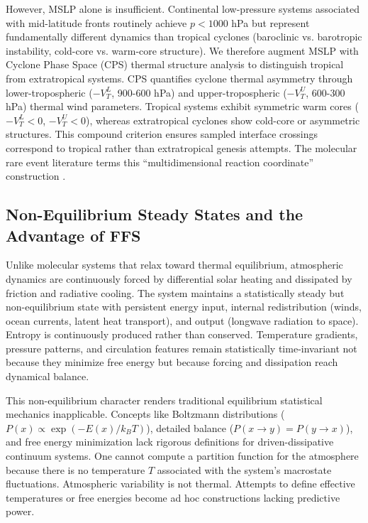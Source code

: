 \documentclass[11pt]{article}
\begin{document}
However, MSLP alone is insufficient. Continental low-pressure systems associated with mid-latitude fronts routinely achieve $p < 1000$ hPa but represent fundamentally different dynamics than tropical cyclones (baroclinic vs. barotropic instability, cold-core vs. warm-core structure). We therefore augment MSLP with Cyclone Phase Space (CPS) thermal structure analysis to distinguish tropical from extratropical systems. CPS quantifies cyclone thermal asymmetry through lower-tropospheric ($-V_T^L$, 900-600 hPa) and upper-tropospheric ($-V_T^U$, 600-300 hPa) thermal wind parameters. Tropical systems exhibit symmetric warm cores ($-V_T^L < 0$, $-V_T^U < 0$), whereas extratropical cyclones show cold-core or asymmetric structures. This compound criterion ensures sampled interface crossings correspond to tropical rather than extratropical genesis attempts. The molecular rare event literature terms this ``multidimensional reaction coordinate'' construction \citep{defever2019contour}.

\subsection{Non-Equilibrium Steady States and the Advantage of FFS}

Unlike molecular systems that relax toward thermal equilibrium, atmospheric dynamics are continuously forced by differential solar heating and dissipated by friction and radiative cooling. The system maintains a statistically steady but non-equilibrium state with persistent energy input, internal redistribution (winds, ocean currents, latent heat transport), and output (longwave radiation to space). Entropy is continuously produced rather than conserved. Temperature gradients, pressure patterns, and circulation features remain statistically time-invariant not because they minimize free energy but because forcing and dissipation reach dynamical balance.

This non-equilibrium character renders traditional equilibrium statistical mechanics inapplicable. Concepts like Boltzmann distributions ($P(x) \propto \exp(-E(x)/k_BT)$), detailed balance ($P(x \to y) = P(y \to x)$), and free energy minimization lack rigorous definitions for driven-dissipative continuum systems. One cannot compute a partition function for the atmosphere because there is no temperature $T$ associated with the system's macrostate fluctuations. Atmospheric variability is not thermal. Attempts to define effective temperatures or free energies become ad hoc constructions lacking predictive power.
\end{document}

